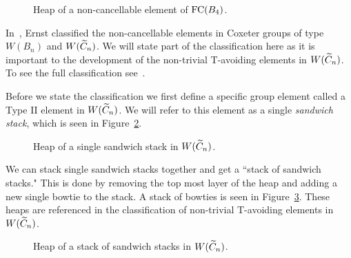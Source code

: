 \begin{figure*}[h!] \centering
{}	
\caption{Heap of a non-cancellable element of $\mathrm{FC}(B_4)$.}\label{fig:noncancelvisual}
\end{figure*}

In~\cite{Ernst2010}, Ernst classified the non-cancellable elements in Coxeter groups of type $W(B_n)$ and $W(\widetilde{C}_n)$. We will state part of the classification here as it is important to the development of the non-trivial T-avoiding elements in $W(\widetilde{C}_n)$. To see the full classification see~\cite[Sections 4.2 and 5]{Ernst2010}. 

Before we state the classification we first define a specific group element called a Type II element in $W(\widetilde{C}_n)$. We will refer to this element as a single \emph{sandwich stack}, which is seen in Figure~\ref{fig:singsandstack}.

\begin{figure}[h!] \centering
{}
\caption{Heap of a single sandwich stack in $W(\widetilde{C}_n)$.}\label{fig:singsandstack}
\end{figure}

We can stack single sandwich stacks together and get a ``stack of sandwich stacks." This is done by removing the top most layer of the heap and adding a new single bowtie to the stack. A stack of bowties is seen in Figure~\ref{fig:stacksandstack}. These heaps are referenced in the classification of non-trivial T-avoiding elements in $W(\widetilde{C}_n)$.

\begin{figure}[h!] \centering
{}	
\caption{Heap of a stack of sandwich stacks in $W(\widetilde{C}_n)$.}\label{fig:stacksandstack}
\end{figure}

